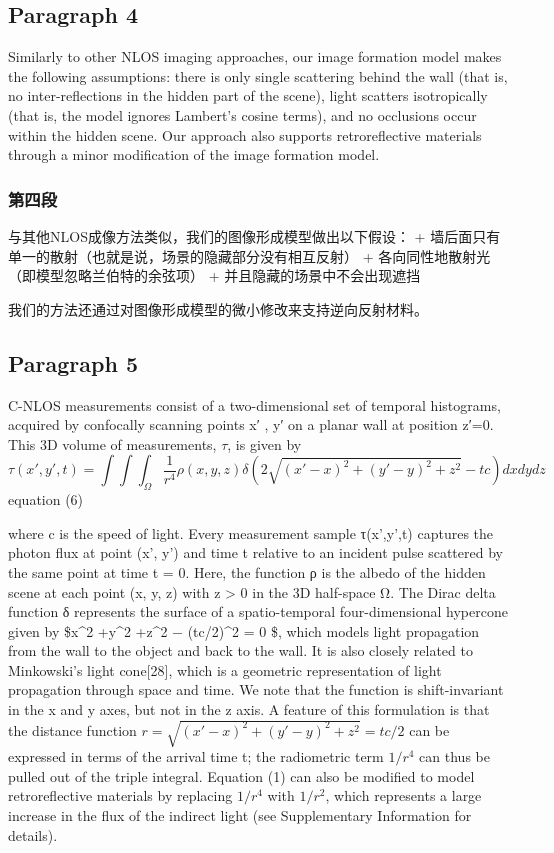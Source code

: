 \documentclass[11pt]{article}
\begin{document}
    \subsection{Paragraph 4}\label{paragraph-4}

Similarly to other NLOS imaging approaches, our image formation model
makes the following assumptions: there is only single scattering behind
the wall (that is, no inter-reflections in the hidden part of the
scene), light scatters isotropically (that is, the model ignores
Lambert's cosine terms), and no occlusions occur within the hidden
scene. Our approach also supports retroreflective materials through a
minor modification of the image formation model.

    \subsubsection{第四段}\label{ux7b2cux56dbux6bb5}

与其他NLOS成像方法类似，我们的图像形成模型做出以下假设： +
墙后面只有单一的散射（也就是说，场景的隐藏部分没有相互反射） +
各向同性地散射光（即模型忽略兰伯特的余弦项） +
并且隐藏的场景中不会出现遮挡

我们的方法还通过对图像形成模型的微小修改来支持逆向反射材料。

    \subsection{Paragraph 5}\label{paragraph-5}

C-NLOS measurements consist of a two-dimensional set of temporal
histograms, acquired by confocally scanning points x′ , y′ on a planar
wall at position z′=0. This 3D volume of measurements, \(\tau\), is
given by\\

\[\tau(x',y',t)=\int\int\int_{\Omega}\frac{1}{r^{4}}\rho(x,y,z)\delta(2\sqrt{(x'-x)^{2}+(y'-y)^{2}+z^{2}}-tc)dxdydz\]
equation (6)

where c is the speed of light. Every measurement sample τ(x',y',t)
captures the photon flux at point (x', y') and time t relative to an
incident pulse scattered by the same point at time t = 0. Here, the
function ρ is the albedo of the hidden scene at each point (x, y, z)
with z \textgreater{} 0 in the 3D half-space Ω. The Dirac delta function
δ represents the surface of a spatio-temporal four-dimensional hypercone
given by \$x\^{}2 +y\^{}2 +z\^{}2 − (tc/2)\^{}2 = 0 \$, which models
light propagation from the wall to the object and back to the wall. It
is also closely related to Minkowski's light cone{[}28{]}, which is a
geometric representation of light propagation through space and time. We
note that the function is shift-invariant in the x and y axes, but not
in the z axis. A feature of this formulation is that the distance
function \(r= \sqrt{(x'−x)^2 +(y'−y)^2 +z^2} =tc/2\) can be expressed in
terms of the arrival time t; the radiometric term \(1/r^4\) can thus be
pulled out of the triple integral. Equation (1) can also be modified to
model retroreflective materials by replacing \(1/r^4\) with \(1/r^2\),
which represents a large increase in the flux of the indirect light (see
Supplementary Information for details).
\end{document}
